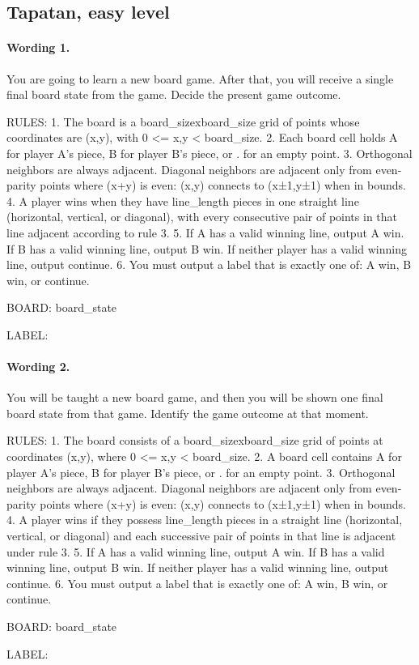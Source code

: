\subsection*{Tapatan, easy level}

\paragraph{Wording 1.}
\begin{promptbox}
You are going to learn a new board game. After that, you will receive a single final board state from the game. Decide the present game outcome.

RULES:
1. The board is a {board_size}x{board_size} grid of points whose coordinates are (x,y), with 0 <= x,y < {board_size}.
2. Each board cell holds A for player A's piece, B for player B's piece, or . for an empty point.
3. Orthogonal neighbors are always adjacent. Diagonal neighbors are adjacent only from even-parity points where (x+y) is even: (x,y) connects to (x±1,y±1) when in bounds.
4. A player wins when they have {line_length} pieces in one straight line (horizontal, vertical, or diagonal), with every consecutive pair of points in that line adjacent according to rule 3.
5. If A has a valid winning line, output A win. If B has a valid winning line, output B win. If neither player has a valid winning line, output continue.
6. You must output a label that is exactly one of: A win, B win, or continue.

BOARD:
{board_state}

LABEL:
\end{promptbox}

\paragraph{Wording 2.}
\begin{promptbox}
You will be taught a new board game, and then you will be shown one final board state from that game. Identify the game outcome at that moment.

RULES:
1. The board consists of a {board_size}x{board_size} grid of points at coordinates (x,y), where 0 <= x,y < {board_size}.
2. A board cell contains A for player A's piece, B for player B's piece, or . for an empty point.
3. Orthogonal neighbors are always adjacent. Diagonal neighbors are adjacent only from even-parity points where (x+y) is even: (x,y) connects to (x±1,y±1) when in bounds.
4. A player wins if they possess {line_length} pieces in a straight line (horizontal, vertical, or diagonal) and each successive pair of points in that line is adjacent under rule 3.
5. If A has a valid winning line, output A win. If B has a valid winning line, output B win. If neither player has a valid winning line, output continue.
6. You must output a label that is exactly one of: A win, B win, or continue.

BOARD:
{board_state}

LABEL:
\end{promptbox}

